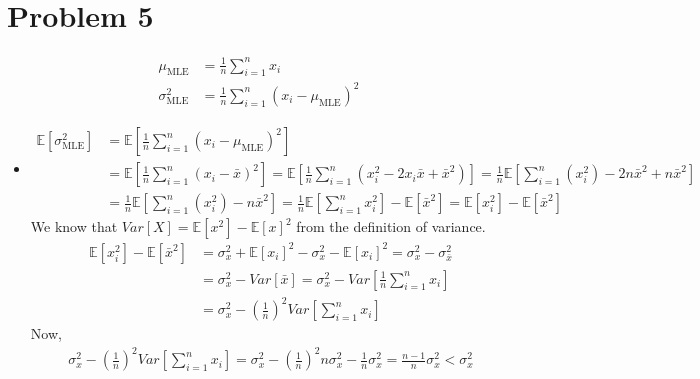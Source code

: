 \section{Problem 5}

	\begin{align*}
		\mu_{\text{MLE}} & = \frac{1}{n} \sum_{i=1}^{n} x_{i} \\
		\sigma_{\text{MLE}}^{2} & = \frac{1}{n} \sum_{i=1}^{n} (x_{i} - \mu_{\text{MLE}})^{2}
	\end{align*}
	
	\begin{itemize}
		\item 
			\begin{align*}
				\mathbb{E}[\sigma_{\text{MLE}}^{2}] & = \mathbb{E} \left[ \frac{1}{n} \sum_{i=1}^{n} (x_{i} - \mu_{\text{MLE}})^{2}	\right] \\
				& = \mathbb{E} \left[ \frac{1}{n} \sum_{i=1}^{n} (x_{i} - \bar{x})^{2}	\right] 
				= \mathbb{E} \left[ \frac{1}{n} \sum_{i=1}^{n} (x_{i}^{2} - 2x_{i}\bar{x} + \bar{x}^{2}) \right] 
				= \frac{1}{n} \mathbb{E} \left[ \sum_{i=1}^{n} (x_{i}^{2}) - 2n\bar{x}^{2} +  n \bar{x}^{2} \right] \\
				& = \frac{1}{n} \mathbb{E} \left[ \sum_{i=1}^{n} (x_{i}^{2}) - n\bar{x}^{2} \right]
				= \frac{1}{n} \mathbb{E} \left[ \sum_{i=1}^{n} x_{i}^{2} \right] - \mathbb{E} \left[ \bar{x}^{2} \right]
				= \mathbb{E} \left[ x_{i}^{2} \right] - \mathbb{E} \left[ \bar{x}^{2} \right]
			\end{align*}
			We know that $Var[X] = \mathbb{E}[x^{2}] - \mathbb{E}[x]^{2}$ from the definition of variance.
			\begin{align*}
				\mathbb{E} \left[ x_{i}^{2} \right] - \mathbb{E} \left[ \bar{x}^{2} \right] & = \sigma_{x}^{2} + \mathbb{E}[x_{i}]^{2} - \sigma_{x}^{2} - \mathbb{E}[x_{i}]^{2} = \sigma_{x}^{2} - \sigma_{\bar{x}}^{2} \\
				& = \sigma_{x}^{2} - Var[\bar{x}] = \sigma_{x}^{2} - Var \left[ \frac{1}{n} \sum_{i=1}^{n} x_{i} \right] \\
				& = \sigma_{x}^{2} - \left( \frac{1}{n} \right)^{2} Var\left[ \sum_{i=1}^{n} x_{i} \right]
			\end{align*}
			Now, 
			\begin{align*}
				\sigma_{x}^{2} - \left( \frac{1}{n} \right)^{2} Var\left[ \sum_{i=1}^{n} x_{i} \right] 
				= \sigma_{x}^{2} - \left( \frac{1}{n} \right)^{2} n \sigma_{x}^{2} - \frac{1}{n} \sigma_{x}^{2}	
				= \boxed{ \frac{n - 1}{n} \sigma_{x}^{2} < \sigma_{x}^{2} }
			\end{align*}

\end{itemize}
